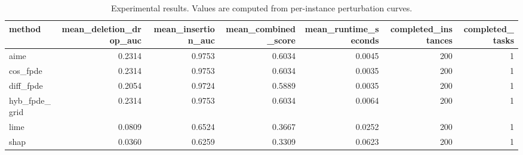 \begin{table}[t]
\caption{Experimental results. Values are computed from per-instance perturbation curves.}
\label{tab:main_results_computed}
\centering
\begin{tabular}{lrrrrrr}
\toprule
method & mean\_deletion\_drop\_auc & mean\_insertion\_auc & mean\_combined\_score & mean\_runtime\_seconds & completed\_instances & completed\_tasks \\
\midrule
aime & 0.2314 & 0.9753 & 0.6034 & 0.0045 & 200 & 1 \\
cos\_fpde & 0.2314 & 0.9753 & 0.6034 & 0.0035 & 200 & 1 \\
diff\_fpde & 0.2054 & 0.9724 & 0.5889 & 0.0035 & 200 & 1 \\
hyb\_fpde\_grid & 0.2314 & 0.9753 & 0.6034 & 0.0064 & 200 & 1 \\
lime & 0.0809 & 0.6524 & 0.3667 & 0.0252 & 200 & 1 \\
shap & 0.0360 & 0.6259 & 0.3309 & 0.0623 & 200 & 1 \\
\bottomrule
\end{tabular}

\end{table}
